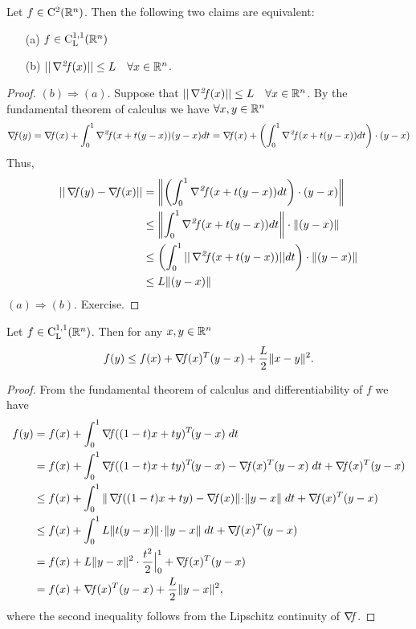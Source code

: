 \documentclass[10pt,a4paper]{article}
\begin{document}
\begin{theorem}
	Let $f\in\mathord{\mathrm{C^2}}(\mathbb{R}^n)$. Then the following two claims are equivalent:
	\begin{itemize}
		\item[(a)] $f\in \mathord{\mathrm{C^{1,1}_{L}}}(\mathbb{R}^n)$
		\item[(b)] $||\operatorname*{\mathit{\nabla^2 \!f}}(x)||\leq L \quad \forall x\in \mathbb{R}^n$.
	\end{itemize}
\begin{proof}
	$(b)\Rightarrow (a)$. Suppose that $||\operatorname*{\mathit{\nabla^2 \!f}}(x)||\leq L \quad \forall x\in \mathbb{R}^n$. By the fundamental theorem of calculus we have $\forall x,y \in \mathbb{R}^n$
	\begin{equation*}
		\begin{split}
			\operatorname*{\mathit{\nabla \!f}}(y)=\operatorname*{\mathit{\nabla \!f}}(x) + \int_{0}^{1} \operatorname*{\mathit{\nabla^2 \!f}}(x+t(y-x)) (y-x) dt = \operatorname*{\mathit{\nabla \!f}}(x) + \left(\int_{0}^{1} \operatorname*{\mathit{\nabla^2 \!f}}(x+t(y-x)) dt  \right) \cdot (y-x)
		\end{split}
	\end{equation*}
Thus, 
\begin{equation*}
	\begin{split}
		||\operatorname*{\mathit{\nabla \!f}}(y)-\operatorname*{\mathit{\nabla \!f}}(x)|| &= \left \| \left(\int_{0}^{1} \operatorname*{\mathit{\nabla^2 \!f}}(x+t(y-x)) dt  \right) \cdot (y-x)\right \|\\
		&\leq \left\|\int_{0}^{1} \operatorname*{\mathit{\nabla^2 \!f}}(x+t(y-x)) dt  \right\| \cdot \|(y-x) \|\\
		& \leq \left(\int_{0}^{1}|| \operatorname*{\mathit{\nabla^2 \!f}}(x+t(y-x))|| dt  \right)\cdot \|(y-x) \|\\
		& \leq L \|(y-x) \|
	\end{split}
\end{equation*}
	$(a)\Rightarrow (b)$. Exercise.
\end{proof}
\end{theorem}
\begin{lemma} Let $f\in \mathord{\mathrm{C^{1,1}_{L}}}(\mathbb{R}^n)$. Then for any $x,y \in \mathbb{R}^n$
	\begin{equation*}
		f(y) \leq f(x) + \operatorname*{\mathit{\nabla \!f}}(x)^T(y-x) + \frac{L}{2} \|x-y\|^2.
	\end{equation*}
\end{lemma}
\begin{proof}
From the fundamental theorem of calculus and differentiability of $f$ we have 
\begin{equation*}
	\begin{split}
		f (y) & = f(x) + \int_{0}^{1} \grad((1-t)x + t y)^T\! (y-x) \; dt\\
		& = f(x) + \int_{0}^{1} \grad((1-t)x + t y)^T\! (y-x) - \grad(x)^T(y-x) \; dt + \grad(x)^T(y-x)\\ 
		&\leq f(x) + \int_{0}^{1} \| \grad((1-t)x + t y) - \grad(x)\|\! \cdot\! \|y-x\| \; dt + \grad(x)^T(y-x)\\  
		& \leq f(x) + \int_{0}^{1} L \| t(y-x) \|\! \cdot\! \|y-x\| \; dt + \grad(x)^T(y-x)\\
		& = f(x) + L\|y-x\|^2 \cdot \frac{t^2}{2} \Big|_0^1 + \grad(x)^T(y-x)\\
		& = f(x) + \grad(x)^T(y-x) + \frac{L}{2} \|y-x\|^2,
	\end{split}
\end{equation*}
where the second inequality follows from the Lipschitz continuity of $\operatorname*{\mathit{\nabla \!f}}$.
\end{proof}
\end{document}
